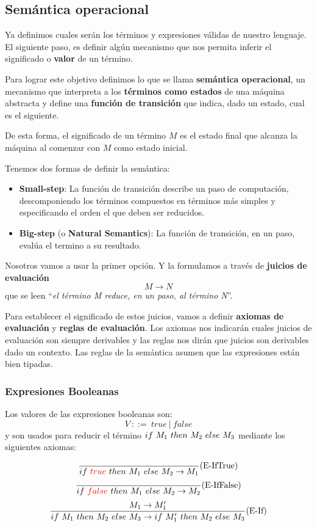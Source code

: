 \subsection{Semántica operacional}Ya definimos cuales serán los términos y expresiones válidas de nuestro lenguaje. El siguiente paso, es definir algún mecanismo que nos permita inferir el significado o \textbf{valor} de un término. 

Para lograr este objetivo definimos lo que se llama \textbf{semántica operacional}, un mecanismo que interpreta a los \textbf{términos como estados} de una máquina abstracta y define una \textbf{función de transición} que indica, dado un estado, cual es el siguiente.

De esta forma, el significado de un término $M$ es el estado final que alcanza la máquina al comenzar con $M$ como estado inicial.

Tenemos dos formas de definir la semántica:
\begin{itemize}
    \item \textbf{Small-step}: La función de transición describe un paso de computación, descomponiendo los términos compuestos en términos más simples y especificando el orden el que deben ser reducidos.
    \item \textbf{Big-step} (o \textbf{Natural Semantics}): La función de transición, en un paso, evalúa el termino a su resultado.
\end{itemize}

Nosotros vamos a usar la primer opción. Y la formulamos a través de \textbf{juicios de evaluación} 
$$M\to N$$ que se leen ``\textit{el término M reduce, en un paso, al término N}''.

Para establecer el significado de estos juicios, vamos a definir \textbf{axiomas de evaluación} y \textbf{reglas de evaluación}. Los axiomas nos indicarán cuales juicios de evaluación son siempre derivables y las reglas nos dirán que juicios son derivables dado un contexto. Las reglas de la semántica asumen que las expresiones están bien tipadas.

\subsubsection{Expresiones Booleanas}\label{calculo_lambda:semantica:booleanas}
Los valores de las  expresiones booleanas son:
$$ V~::=~true~|~false$$
y son usados para reducir el término $if~ M_1~ then~ M_2~ else~ M_3$ mediante los siguientes axiomas:

\begin{equation*}
\frac{}{if~ \color{red}true\color{black}~ then~ M_1~ else~ M_2 \to M_1}(\text{E-IfTrue})
\end{equation*}
\vspace*{5mm}
\begin{equation*}
\frac{}{if~ \color{red}false\color{black}~ then~ M_1~ else~ M_2 \to M_2}(\text{E-IfFalse})
\end{equation*}
\vspace*{5mm}
\begin{equation*}
\frac{M_1\to M'_1}{if~ M_1~ then~ M_2~ else~ M_3\to if~ M'_1~ then~ M_2~ else~ M_3}(\text{E-If})
\end{equation*}

